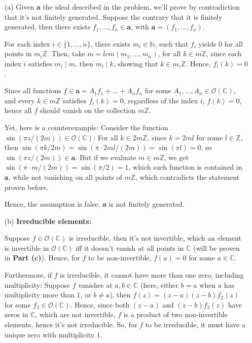 \documentclass{article}
\begin{document}
\begin{itemize}
    \item[(a)] Given $\textbf{a}$ the ideal described in the problem, we'll prove by contradiction that it's not finitely generated.
    Suppose the contrary that it is finitely generated, then there exists $f_1,...,f_n\in\textbf{a}$, with $\textbf{a}=(f_1,...,f_n)$.

    For each index $i\in\{1,...,n\}$, there exists $m_i\in\mathbb{N}$, such that $f_i$ yields $0$ for all points in $m_i\mathbb{Z}$.
    Then, take $m=lcm(m_1,...,m_n)$, for all $k\in m\mathbb{Z}$, since each index $i$ satisfies $m_i\mid m$, then $m_i\mid k$, showing that $k\in m_i\mathbb{Z}$.
    Hence, $f_i(k)=0$.

    Since all functions $f\in\textbf{a} = A_1f_1+...+A_nf_n$ for some $A_1,...,A_n\in\mathcal{O}(\mathbb{C})$, and every $k\in m\mathbb{Z}$ satisfies $f_i(k)=0$, regardless of the index $i$,
     $f(k)=0$, hence all $f$ should vanish on the collection $m\mathbb{Z}$.

    Yet, here is a counterexample: Consider the function $\sin(\pi z/(2m))\in\mathcal{O}(\mathbb{C})$: For all $k\in 2m\mathbb{Z}$, since $k=2ml$ for some $l\in\mathbb{Z}$,
    then $\sin(\pi k/2m)=\sin(\pi\cdot 2ml/(2m))=\sin(\pi l)=0$, so $\sin(\pi z/(2m))\in \textbf{a}$.
    But if we evaluate $m\in m\mathbb{Z}$, we get $\sin(\pi\cdot m/(2m))=\sin(\pi/2)=1$, which such function is contained in $\textbf{a}$, while not vanishing on all points of $m\mathbb{Z}$,
    which contradicts the statement proven before. 

    Hence, the assumption is false, $\textbf{a}$ is not finitely generated.

    \hfil

    \item[(b)] \textbf{Irreducible elements:}
    
    Suppose $f\in\mathcal{O}(\mathbb{C})$ is irreducible, then it's not invertible, which an element is invertible in $\mathcal{O}(\mathbb{C})$ iff it doesn't vanish at all points in $\mathbb{C}$ (will be proven in \textbf{Part (c)}).
    Hence, for $f$ to be non-invertible, $f(a)=0$ for some $a\in\mathbb{C}$.

    Furthermore, if $f$ is irreducible, it cannot have more than one zero, including multiplicity: Suppose $f$ vanishes at $a,b\in\mathbb{C}$ (here, either $b=a$ when $a$ has multiplicity more than $1$, or $b\neq a$),
    then $f(z)=(z-a)(z-b)f_2(z)$ for some $f_2\in\mathcal{O}(\mathbb{C})$. Hence, since both $(z-a)$ and $(z-b)f_2(z)$ have zeros in $\mathbb{C}$, which are not invertible, $f$ is a product of two non-invertible elements, hence it's not irreducible.
    So, for $f$ to be irreducible, it must have a unique zero with multiplicity $1$.


\end{itemize}
\end{document}
